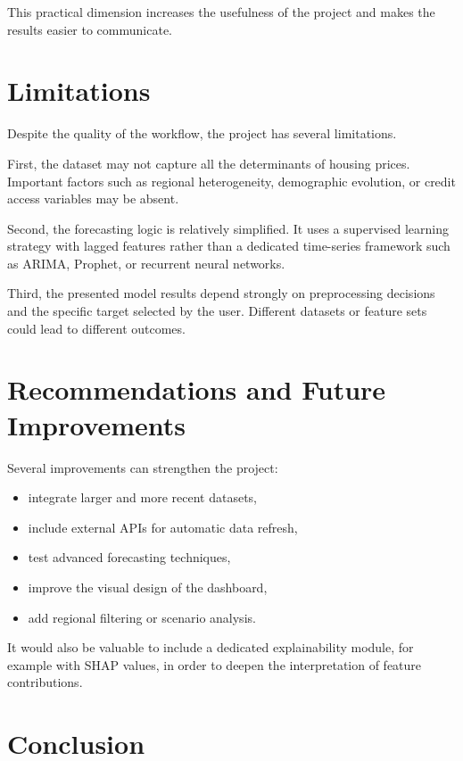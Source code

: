 This practical dimension increases the usefulness of the project and makes the results easier to communicate.



\section{Limitations}

Despite the quality of the workflow, the project has several limitations.

First, the dataset may not capture all the determinants of housing prices.
Important factors such as regional heterogeneity, demographic evolution, or credit access variables may be absent.

Second, the forecasting logic is relatively simplified.
It uses a supervised learning strategy with lagged features rather than a dedicated time-series framework such as ARIMA, Prophet, or recurrent neural networks.

Third, the presented model results depend strongly on preprocessing decisions and the specific target selected by the user.
Different datasets or feature sets could lead to different outcomes.

\section{Recommendations and Future Improvements}

Several improvements can strengthen the project:
\begin{itemize}
\item integrate larger and more recent datasets,
\item include external APIs for automatic data refresh,
\item test advanced forecasting techniques,
\item improve the visual design of the dashboard,
\item add regional filtering or scenario analysis.
\end{itemize}

It would also be valuable to include a dedicated explainability module, for example with SHAP values, in order to deepen the interpretation of feature contributions.

\section{Conclusion}

